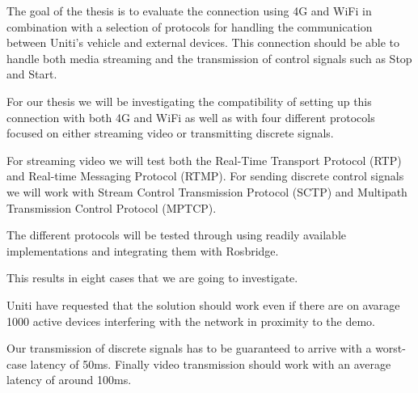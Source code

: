 \documentclass[a4paper]{article}
\begin{document}


The goal of the thesis is to evaluate the connection using 4G and WiFi in
combination with a selection of protocols for handling the communication between
Uniti's vehicle and external devices. This connection should be able to handle
both media streaming and the transmission of control signals such as Stop and
Start.




For our thesis we will be investigating the compatibility of setting up this
connection with both 4G and WiFi as well as with four different protocols
focused on either streaming video or transmitting discrete signals.

For streaming video we will test both the Real-Time Transport Protocol (RTP)
and Real-time Messaging Protocol (RTMP). For sending discrete control signals we will
work with Stream Control Transmission Protocol (SCTP) and Multipath Transmission
Control Protocol (MPTCP).

The different protocols will be tested through using readily available implementations
and integrating them with Rosbridge.

This results in eight cases that we are going to investigate.

Uniti have requested that the solution should work even if there are on avarage
1000 active devices interfering with the network in proximity to the
demo.

Our transmission of discrete signals has to be guaranteed to arrive with a
worst-case latency of 50ms. Finally video transmission should work with an
average latency of around 100ms.



\end{document}
